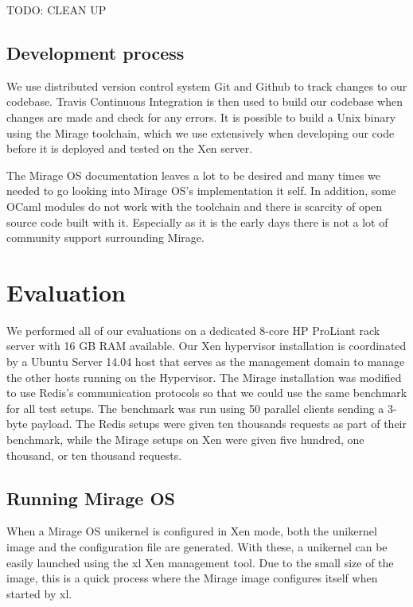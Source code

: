 \documentclass[english,10pt,twocolumn]{article}
\begin{document}
TODO: CLEAN UP

\subsection{Development process}

We use distributed version control system Git and Github to track changes to our codebase.
Travis Continuous Integration is then used to build our codebase when changes are made and check for any errors.
It is possible to build a Unix binary using the Mirage toolchain, which we use extensively when developing our code before it is deployed and tested on the Xen server.

The Mirage OS documentation leaves a lot to be desired and many times we needed to go looking into Mirage OS's implementation it self.
In addition, some OCaml modules do not work with the toolchain and there is scarcity of open source code built with it.
Especially as it is the early days there is not a lot of community support surrounding Mirage.


\section{Evaluation}

We performed all of our evaluations on a dedicated 8-core HP ProLiant rack server with 16 GB RAM available.
Our Xen hypervisor installation is coordinated by a Ubuntu Server 14.04 host that serves as the management domain to manage the other hosts running on the Hypervisor.
The Mirage installation was modified to use Redis's communication protocols so that we could use the same benchmark for all test setups. The benchmark was run using 50 parallel clients sending a 3-byte payload.
The Redis setups were given ten thousands requests as part of their benchmark, while the Mirage setups on Xen were given five hundred, one thousand, or ten thousand requests.


\subsection{Running Mirage OS}

When a Mirage OS unikernel is configured in Xen mode, both the unikernel image and the configuration file are generated.
With these, a unikernel can be easily launched using the xl Xen management tool.
Due to the small size of the image, this is a quick process where the Mirage image configures itself when started by xl.
\end{document}
